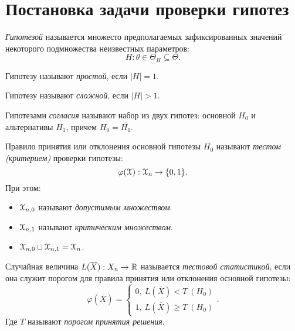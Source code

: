 \section{Постановка задачи проверки гипотез}

\begin{definition}
	\textit{Гипотезой} называется множесто предполагаемых зафиксированных значений
	некоторого подмножества неизвестных параметров:
	\[
		H: \theta \in \Theta_{H} \subseteq \Theta
	.\]
\end{definition}

\begin{definition}
	Гипотезу называют \textit{простой}, если $|H| = 1$.
\end{definition}

\begin{definition}
	Гипотезу называют \textit{сложной}, если $|H| > 1$.
\end{definition}

\begin{definition}
	Гипотезами \textit{согласия} называют набор из двух гипотез: основной $H_0$ и
	альтернативы $H_1$, причем $H_0 = \overline{H_1}$.
\end{definition}

\begin{definition}
	Правило принятия или отклонения основной гипотезы $H_0$ называют
	\textit{тестом (критерием)} проверки гипотезы:
	\[
		\varphi(\mathcal{X}): \mathcal{X}_{n} \to \{0, 1\}
	.\]
	При этом:
	\begin{itemize}
		\item $\mathcal{X}_{n, 0}$ называют \textit{допустимым множеством}.
		\item $\mathcal{X}_{n, 1}$ называют \textit{критическим множеством}.
		\item $\mathcal{X}_{n, 0} \sqcup \mathcal{X}_{n, 1} = \mathcal{X}_{n}$.
	\end{itemize}
\end{definition}

\begin{definition}
	Случайная величина $L(\overline{X}): X_n \to \mathbb{R}$ называется
	\textit{тестовой статистикой}, если она служит порогом для правила принятия
	или отклонения основной гипотезы:
	\[
		\varphi(\overline{X}) = \begin{cases}
			0,~ L(\overline{X}) < T \> (H_0) \\
			1,~ L(\overline{X}) \geqslant T \> (H_0)
		\end{cases}
	.\]
	Где $T$ называют \textit{порогом принятия решения}.
\end{definition}

